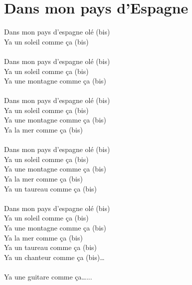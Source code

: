 \section*{Dans mon pays d'Espagne}
Dans mon pays d'espagne olé (bis)\\
Ya un soleil comme ça (bis)\\\\
Dans mon pays d'espagne olé (bis)\\
Ya un soleil comme ça (bis)\\
Ya une montagne comme ça (bis)\\\\
Dans mon pays d'espagne olé (bis)\\
Ya un soleil comme ça (bis)\\
Ya une montagne comme ça (bis)\\
Ya la mer comme ça (bis)\\\\
Dans mon pays d'espagne olé (bis)\\
Ya un soleil comme ça (bis)\\
Ya une montagne comme ça (bis)\\
Ya la mer comme ça (bis)\\
Ya un taureau comme ça (bis)\\\\
Dans mon pays d'espagne olé (bis)\\
Ya un soleil comme ça (bis)\\
Ya une montagne comme ça (bis)\\
Ya la mer comme ça (bis)\\
Ya un taureau comme ça (bis)\\
Ya un chanteur comme ça (bis)…\\\\
Ya une guitare comme ça…... \\